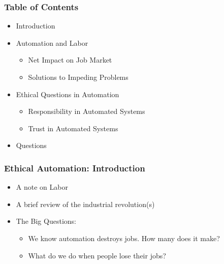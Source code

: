 



\begin{frame}
	\frametitle{ Table of Contents}
	\begin{itemize}
		\item Introduction
		\item Automation and Labor
		\begin{itemize}
			\item Net Impact on Job Market
			\item Solutions to Impeding Problems
		\end{itemize}
		\item Ethical Questions in Automation
		\begin{itemize}
			\item Responsibility in Automated Systems
			\item Trust in Automated Systems
		\end{itemize}
		\item Questions
	\end{itemize}
\end{frame}


\begin{frame}
	\frametitle{ Ethical Automation: Introduction}
	\begin{itemize}
		\item A note on Labor
		\item A brief review of the industrial revolution(s)
		\item The Big Questions:
		\begin{itemize}
			\item We know automation destroys jobs.  How many does it make?
			\item What do we do when people lose their jobs?
		\end{itemize}
	\end{itemize}
\end{frame}


